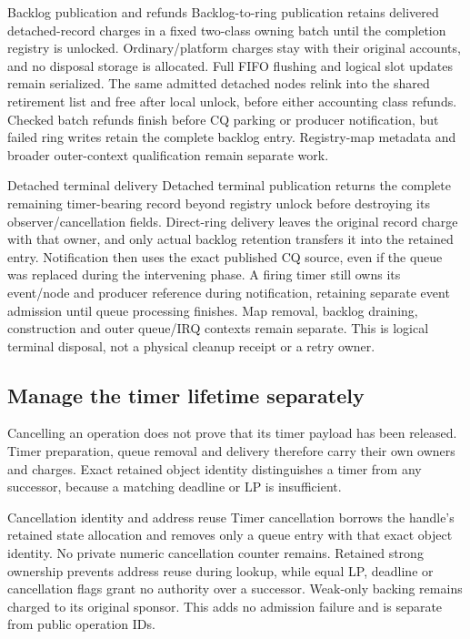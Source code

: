 \begin{implementationdetail}{Backlog publication and refunds}
Backlog-to-ring publication retains delivered detached-record charges in a
fixed two-class owning batch until the completion registry is unlocked.
Ordinary/platform charges stay with their original accounts, and no disposal storage
is allocated. Full FIFO flushing and logical slot updates remain serialized.
The same admitted detached nodes relink into the shared retirement list and
free after local unlock, before either accounting class refunds.
Checked batch refunds finish before CQ parking or producer notification, but
failed ring writes retain the complete backlog entry. Registry-map metadata
and broader outer-context qualification remain separate work.
\end{implementationdetail}

\begin{implementationdetail}{Detached terminal delivery}
Detached terminal publication returns the complete remaining timer-bearing
record beyond registry unlock before destroying its observer/cancellation
fields. Direct-ring delivery leaves the original record charge with that owner, and
only actual backlog retention transfers it into the retained entry. Notification
then uses the exact published CQ source, even if the queue was replaced during
the intervening phase. A firing timer still owns its event/node and producer
reference during notification, retaining separate event admission until queue
processing finishes. Map removal, backlog draining, construction and outer
queue/IRQ contexts remain separate. This is logical terminal disposal, not a
physical cleanup receipt or a retry owner.
\end{implementationdetail}

\subsection{Manage the timer lifetime separately}

Cancelling an operation does not prove that its timer payload has been released.
Timer preparation, queue removal and delivery therefore carry their own owners
and charges. Exact retained object identity distinguishes a timer from any
successor, because a matching deadline or LP is insufficient.

\begin{implementationdetail}{Cancellation identity and address reuse}
Timer cancellation borrows the handle's retained state allocation and removes
only a queue entry with that exact object identity. No private numeric
cancellation counter remains. Retained strong ownership prevents address reuse
during lookup, while equal LP, deadline or cancellation flags grant no authority over
a successor. Weak-only backing remains charged to its original sponsor.
This adds no admission failure and is separate from public operation IDs.
\end{implementationdetail}

